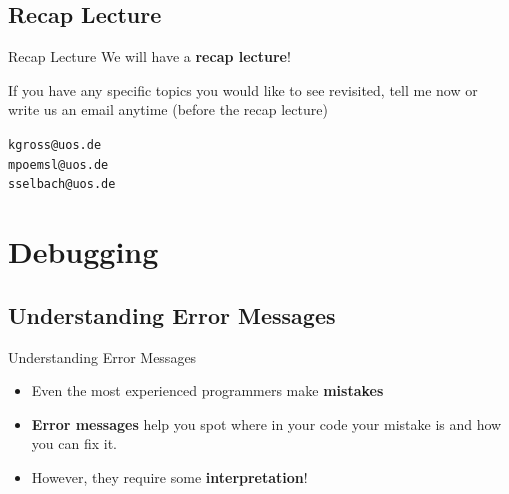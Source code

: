 \subsection{Recap Lecture}

\begin{frame}{Recap Lecture}
    We will have a \textbf{recap lecture}!

    \vspace{1em}
    If you have any specific topics you would like to see revisited, tell me now or write us an email anytime (before the recap lecture)

    \vspace{1em}
    \texttt{kgross@uos.de \\
    mpoemsl@uos.de \\
    sselbach@uos.de}
\end{frame}

\section{Debugging}

\subsection{Understanding Error Messages}

\begin{frame}{Understanding Error Messages}

    \begin{itemize}
        \item Even the most experienced programmers make \textbf{mistakes}
        \item \textbf{Error messages} help you spot where in your code your mistake is and how you can fix it.
        \item However, they require some \textbf{interpretation}!
    \end{itemize}


\end{frame}

